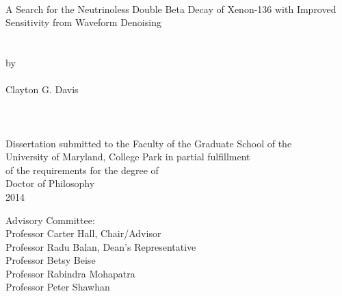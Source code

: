 
\thispagestyle{empty}
\hbox{\ }
\vspace{1in}
\renewcommand{\baselinestretch}{1}
\small\normalsize
\begin{center}

\large{{A Search for the Neutrinoless Double Beta Decay of Xenon-136 with Improved Sensitivity from Waveform Denoising}}\\
\ \\
\ \\
\large{by} \\
\ \\
\large{Clayton G. Davis}%
\ \\
\ \\
\ \\
\ \\
\normalsize
Dissertation submitted to the Faculty of the Graduate School of the \\
University of Maryland, College Park in partial fulfillment \\
of the requirements for the degree of \\
Doctor of Philosophy \\
2014
\end{center}

\vspace{7.5em}

\noindent Advisory Committee: \\
Professor Carter Hall, Chair/Advisor \\
Professor Radu Balan, Dean's Representative \\
Professor Betsy Beise \\
Professor Rabindra Mohapatra \\
Professor Peter Shawhan
